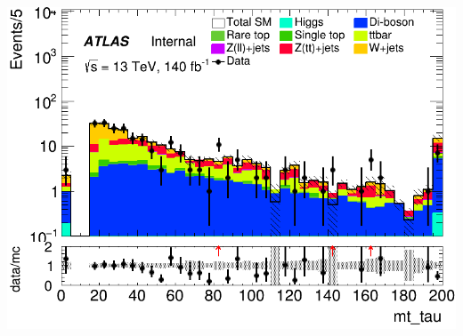 \documentclass[usenames,dvipsnames]{beamer}
\begin{document}
\begin{frame}
\begin{minipage}{0.32\textwidth}
        \includegraphics[width=\textwidth]{graphics/LHH_met/LHH_met_mt_tau.png}
    \end{minipage}
    
    \vspace{0.5cm} %


\end{frame}
\end{document}
